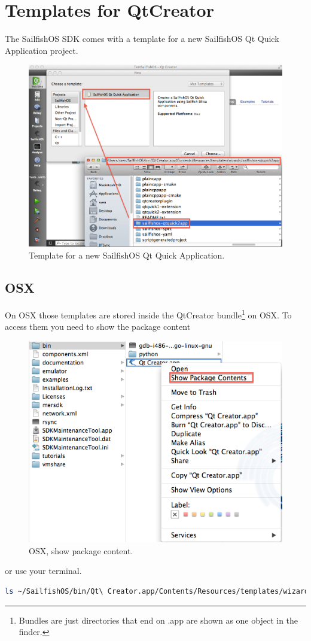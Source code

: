 %
\section{Templates for QtCreator}\label{sec:templateqtcreator}
%
The SailfishOS SDK comes with a template for a new SailfishOS Qt Quick Application project.
%
\begin{figure}[H]
  \centering
  \includegraphics[scale=0.4]{../media/gfx/QtCreator/newprojecttemplate1.png} 
  \caption{Template for a new SailfishOS Qt Quick Application.}
  \label{fig:newprojecttemplate1}
\end{figure}
%
%
\subsection{OSX}
%
On OSX those templates are stored inside the QtCreator bundle\footnote{Bundles are just directories that end on .app are shown as one object in the finder.} on OSX. To access them you need to show the package content
%
\begin{figure}[H]
  \centering
  \includegraphics[scale=0.6]{../media/gfx/QtCreator/templates01-01.png} 
  \caption{OSX, show package content.}
  \label{fig:template01-01}
\end{figure}
%
or use your terminal.
%
\begin{lstlisting}[language=bash]
ls ~/SailfishOS/bin/Qt\ Creator.app/Contents/Resources/templates/wizards
\end{lstlisting}
%
